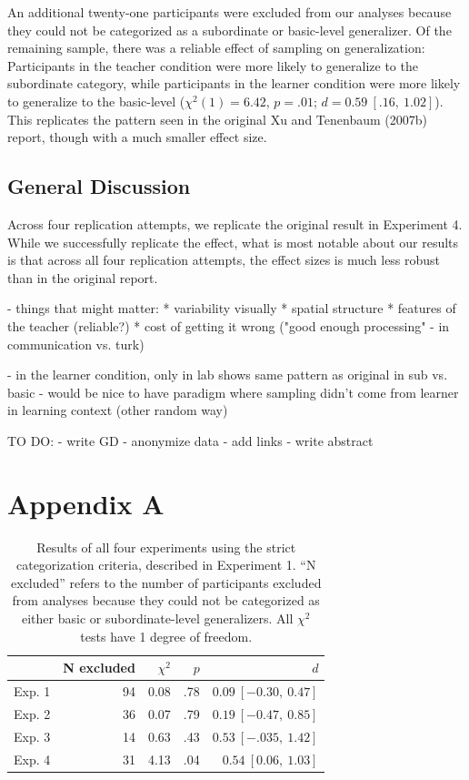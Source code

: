 \documentclass[man]{apa2}
\begin{document}
An additional twenty-one participants were excluded from our analyses because they could not be categorized as a subordinate or basic-level generalizer. Of the remaining sample, there was a reliable effect of sampling on generalization: Participants in the teacher condition were more likely to generalize to the subordinate category, while participants in the learner condition were more likely to generalize to the basic-level ($\chi^2(1) = 6.42$,  $p = .01$; $d = 0.59\ [.16,\ 1.02]$). This replicates the pattern seen in the original Xu and Tenenbaum (2007b) report, though with a much smaller effect size.

\subsection{General Discussion}
Across four replication attempts, we replicate the original result in Experiment 4. While we successfully replicate the effect, what is most notable about our results is that across all four replication attempts, the effect sizes is much less robust than in the original report. 

- things that might matter:
* variability visually
* spatial structure
* features of the teacher (reliable?)
* cost of getting it wrong ("good enough processing" - in communication vs. turk) 

-  in the learner condition, only in lab shows same pattern as original in sub vs. basic
- would be nice to have paradigm where sampling didn't come from learner in learning context (other random way)

TO DO:
- write GD
- anonymize data
- add links
- write abstract

\section{Appendix A}

\begin{table}[h]
\centering
\begin{tabular}{rrrrr}
 \hline
  & N excluded & $\chi^2$ & $p$ & $d$ \\ 
 \hline
Exp. 1 & 94 & 0.08 & .78 & $0.09\ [-0.30,\ 0.47]$\\ 
Exp. 2 & 36 & 0.07 & .79 & $0.19\ [-0.47,\ 0.85]$ \\ 
Exp. 3 & 14 & 0.63 & .43 & $0.53\ [-.035,\ 1.42]$ \\ 
Exp. 4 & 31 & 4.13 & .04 & $0.54\ [0.06,\ 1.03]$\\ 
  \hline
\end{tabular}
\caption{Results of all four experiments using the strict categorization criteria, described in Experiment 1. ``N excluded'' refers to the number of participants excluded from analyses because they could not be categorized as either basic or subordinate-level generalizers. All $\chi^2$ tests have 1 degree of freedom. }
\label{strictResults}
\end{table}
\end{document}
